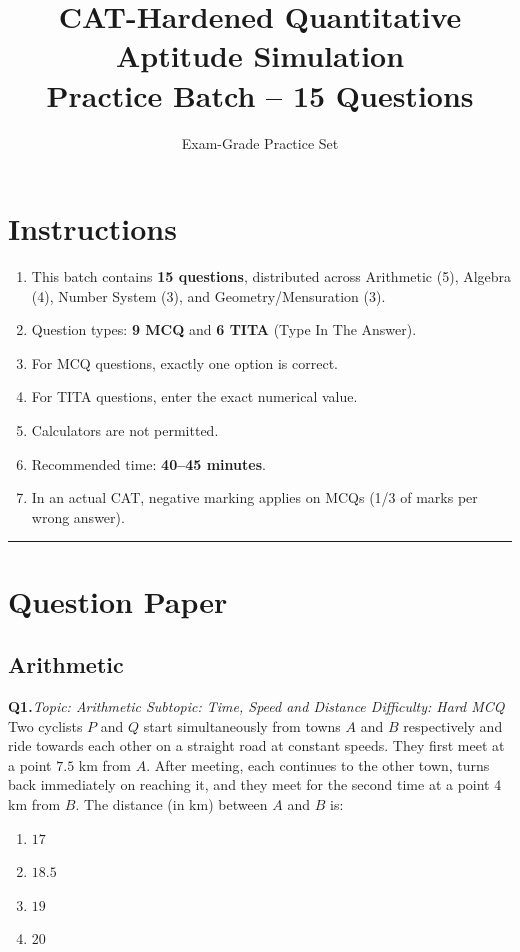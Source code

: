 \documentclass[11pt,a4paper]{article}
\title{\textbf{CAT-Hardened Quantitative Aptitude Simulation}\\[0.3em]
\large Practice Batch -- 15 Questions}
\author{Exam-Grade Practice Set}
\date{}
\newcommand{\qhead}[4]{%
  \vspace{0.7em}\noindent\textbf{Q#1.}\hfill\textit{Topic: #2 \textbar{} Subtopic: #3 \textbar{} Difficulty: #4}\\[-0.2em]
}
\begin{document}
\maketitle

\section*{Instructions}

\begin{enumerate}[leftmargin=*,itemsep=0.2em]
  \item This batch contains \textbf{15 questions}, distributed across Arithmetic (5), Algebra (4), Number System (3), and Geometry/Mensuration (3).
  \item Question types: \textbf{9 MCQ} and \textbf{6 TITA} (Type In The Answer).
  \item For MCQ questions, exactly one option is correct.
  \item For TITA questions, enter the exact numerical value.
  \item Calculators are not permitted.
  \item Recommended time: \textbf{40--45 minutes}.
  \item In an actual CAT, negative marking applies on MCQs (1/3 of marks per wrong answer).
\end{enumerate}

\vspace{0.4em}\hrule\vspace{0.6em}

\section*{Question Paper}

\subsection*{Arithmetic}

\qhead{1}{Arithmetic}{Time, Speed and Distance}{Hard \textbar{} MCQ}
Two cyclists $P$ and $Q$ start simultaneously from towns $A$ and $B$ respectively and ride towards each other on a straight road at constant speeds. They first meet at a point $7.5$ km from $A$. After meeting, each continues to the other town, turns back immediately on reaching it, and they meet for the second time at a point $4$ km from $B$. The distance (in km) between $A$ and $B$ is:
\begin{enumerate}[label=(\Alph*),leftmargin=*]
  \item $17$
  \item $18.5$
  \item $19$
  \item $20$
\end{enumerate}
\end{document}
